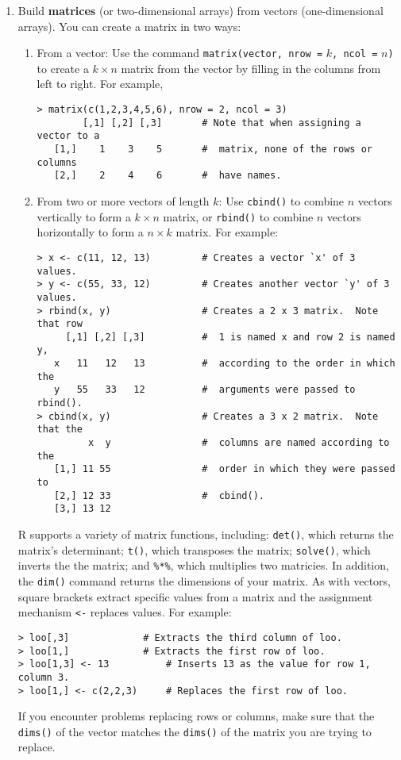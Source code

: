 \begin{enumerate}
\item Build {\bf matrices} (or two-dimensional arrays) from vectors
(one-dimensional arrays).  You can create a matrix in two ways:   
\begin{enumerate}
\item From a vector: Use the command \texttt{matrix(vector, nrow
    =} $k$\texttt{, ncol =} $n$\texttt{)} to create a $k \times n$
    matrix from the vector by filling in the columns from left to
    right.  For example,
\begin{verbatim}
> matrix(c(1,2,3,4,5,6), nrow = 2, ncol = 3)
        [,1] [,2] [,3]       # Note that when assigning a vector to a
   [1,]    1    3    5       #  matrix, none of the rows or columns 
   [2,]    2    4    6       #  have names.  
\end{verbatim}
\item From two or more vectors of length $k$: Use \texttt{cbind()} to
  combine $n$ vectors vertically to form a $k \times n$ matrix, 
  or \texttt{rbind()} to combine $n$ vectors horizontally to form a
  $n \times k$ matrix.  For example:
\begin{verbatim}
> x <- c(11, 12, 13)         # Creates a vector `x' of 3 values.
> y <- c(55, 33, 12)         # Creates another vector `y' of 3 values.  
> rbind(x, y)                # Creates a 2 x 3 matrix.  Note that row
     [,1] [,2] [,3]          #  1 is named x and row 2 is named y, 
   x   11   12   13          #  according to the order in which the
   y   55   33   12          #  arguments were passed to rbind().
> cbind(x, y)                # Creates a 3 x 2 matrix.  Note that the
         x  y                #  columns are named according to the
   [1,] 11 55                #  order in which they were passed to
   [2,] 12 33                #  cbind().  
   [3,] 13 12
\end{verbatim}
\end{enumerate}
R supports a variety of matrix functions, including: \texttt{det()},
which returns the matrix's determinant; \texttt{t()}, which transposes
the matrix; \texttt{solve()}, which inverts the the matrix; and
\texttt{\%*\%}, which multiplies two matricies.  In addition, the
\texttt{dim()} command returns the dimensions of your matrix.  As with
vectors, square brackets extract specific values from a matrix and the
assignment mechanism \texttt{<-} replaces values.  For example:
\begin{verbatim}
> loo[,3]     		  # Extracts the third column of loo.  
> loo[1,]      		  # Extracts the first row of loo.  
> loo[1,3] <- 13          # Inserts 13 as the value for row 1, column 3.  
> loo[1,] <- c(2,2,3)     # Replaces the first row of loo.  
\end{verbatim}
If you encounter problems replacing rows or columns, make sure that
the \texttt{dims()} of the vector matches the \texttt{dims()} of the
matrix you are trying to replace.  


\end{enumerate}
